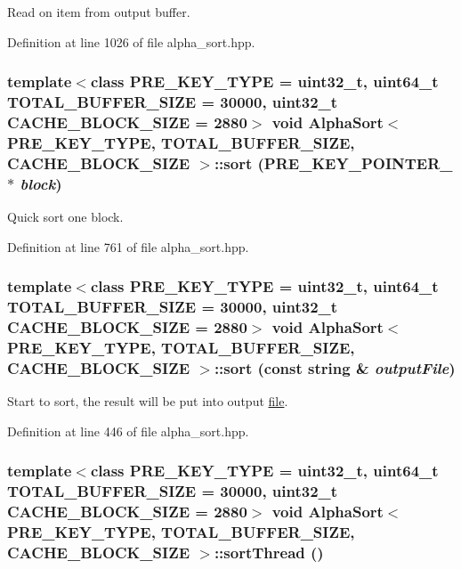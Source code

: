 Read on item from output buffer. 

Definition at line 1026 of file alpha\_\-sort.hpp.\hypertarget{classAlphaSort_64e65dd7a5a0ddbc1c885120d44b2df1}{
\subsubsection[{sort}]{\setlength{\rightskip}{0pt plus 5cm}template$<$class PRE\_\-KEY\_\-TYPE  = uint32\_\-t, uint64\_\-t TOTAL\_\-BUFFER\_\-SIZE = 30000, uint32\_\-t CACHE\_\-BLOCK\_\-SIZE = 2880$>$ void {\bf AlphaSort}$<$ PRE\_\-KEY\_\-TYPE, TOTAL\_\-BUFFER\_\-SIZE, CACHE\_\-BLOCK\_\-SIZE $>$::sort (PRE\_\-KEY\_\-POINTER\_\- $\ast$ {\em block})}}
\label{classAlphaSort_64e65dd7a5a0ddbc1c885120d44b2df1}


Quick sort one block. 

Definition at line 761 of file alpha\_\-sort.hpp.\hypertarget{classAlphaSort_00bb46d99aec8fd91215f102811a1f0f}{
\subsubsection[{sort}]{\setlength{\rightskip}{0pt plus 5cm}template$<$class PRE\_\-KEY\_\-TYPE  = uint32\_\-t, uint64\_\-t TOTAL\_\-BUFFER\_\-SIZE = 30000, uint32\_\-t CACHE\_\-BLOCK\_\-SIZE = 2880$>$ void {\bf AlphaSort}$<$ PRE\_\-KEY\_\-TYPE, TOTAL\_\-BUFFER\_\-SIZE, CACHE\_\-BLOCK\_\-SIZE $>$::sort (const string \& {\em outputFile})}}
\label{classAlphaSort_00bb46d99aec8fd91215f102811a1f0f}


Start to sort, the result will be put into output \hyperlink{classfile}{file}. 

Definition at line 446 of file alpha\_\-sort.hpp.\hypertarget{classAlphaSort_7be5c44eef640a94af6a828aa8ff843e}{
\subsubsection[{sortThread}]{\setlength{\rightskip}{0pt plus 5cm}template$<$class PRE\_\-KEY\_\-TYPE  = uint32\_\-t, uint64\_\-t TOTAL\_\-BUFFER\_\-SIZE = 30000, uint32\_\-t CACHE\_\-BLOCK\_\-SIZE = 2880$>$ void {\bf AlphaSort}$<$ PRE\_\-KEY\_\-TYPE, TOTAL\_\-BUFFER\_\-SIZE, CACHE\_\-BLOCK\_\-SIZE $>$::sortThread ()}}
\label{classAlphaSort_7be5c44eef640a94af6a828aa8ff843e}


